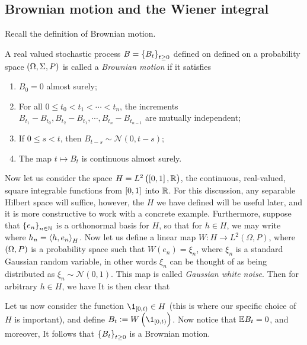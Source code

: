 \documentclass[../main.tex]{subfiles}
\begin{document}
\subsection{Brownian motion and the Wiener integral}
Recall the definition of Brownian motion.
\begin{definition}
\label{def:brownian_motion}
A real valued stochastic process $B = \cbr{B_t}_{t\geq0}$ defined on defined on a probability space $\del{\Omega,\Sigma,P}$ is called a \emph{Brownian motion} if it satisfies \begin{enumerate}
    \item $B_0 = 0$ almost surely;
    \item For all $0 \leq t_0<t_1<\cdots<t_n$, the increments $B_{t_1} - B_{t_0}, B_{t_2} - B_{t_1}, \cdots, B_{t_n}-B_{t_{n-1}}$ are mutually independent;
    \item If $0\leq s<t$, then $B_{t-s}\sim\mathcal{N}(0,t-s)$;
    \item The map $t\mapsto B_t$ is continuous almost surely.
\end{enumerate}
\end{definition}

Now let us consider the space $H = L^2\del{\intcc{0,1},\R}$, the continuous, real-valued, square integrable functions from $\intcc{0,1}$ into $\operatorname{\mathbb{R}}$. For this discussion, any separable Hilbert space will suffice, however, the $H$ we have defined will be useful later, and it is more constructive to work with a concrete example. Furthermore, suppose that $\cbr{e_n}_{n\in\N}$ is a orthonormal basis for $H$, so that for $h\in H$, we may write  where $h_n = \left\langle h,e_n \right\rangle_H$. Now let us define a linear map $W:H\to L^2(\Omega, P)$, where $\del{\Omega,P}$ is a probability space such that $W(e_n) = \xi_n$, where $\xi_n$ is a standard Gaussian random variable, in other words $\xi_n$ can be thought of as being distributed as $\xi_n\sim\mathcal{N}(0,1)$. This map is called \emph{Gaussian white noise}. Then for arbitrary $h\in H$, we have  It is then clear that 

Let us now consider the function $\1_{\intco{0,t}}\in H$ (this is where our specific choice of $H$ is important), and define $B_t := W\del{\1_{\intco{0,t}}}$. Now notice that $\mathbb{E} B_t = 0$, and moreover,  It follows that $\cbr{B_t}_{t\geq0}$ is a Brownian motion.
\end{document}
